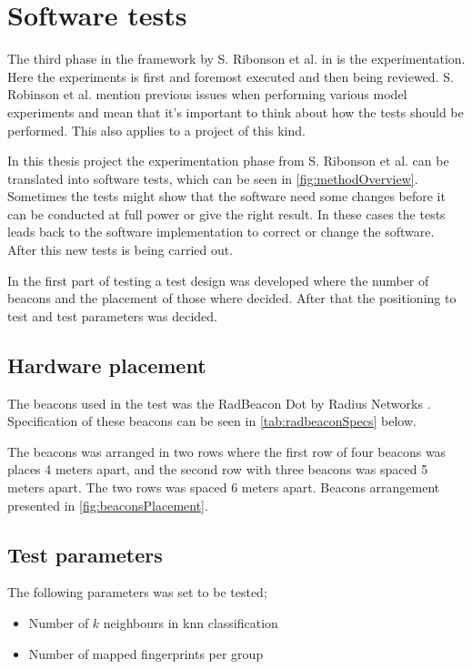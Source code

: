 \section{Software tests}\label{sec:methodSoftwareTests}
The third phase in the framework by S. Ribonson et al. in \cite{SecretsSuccessfulSimulation1995} is the experimentation.
Here the experiments is first and foremost executed and then being reviewed.
S. Robinson et al. mention previous issues when performing various model experiments and mean that it's important to think about how the tests should be performed.
This also applies to a project of this kind.

\bigskip

In this thesis project the experimentation phase from S. Ribonson et al. can be translated into software tests, which can be seen in \cref{fig:methodOverview}.
Sometimes the tests might show that the software need some changes before it can be conducted at full power or give the right result.
In these cases the tests leads back to the software implementation to correct or change the software.
After this new tests is being carried out.

\bigskip

In the first part of testing a test design was developed where the number of beacons and the placement of those where decided.
After that the positioning to test and test parameters was decided.


\subsection{Hardware placement}\label{sec:methodTestHardware}
The beacons used in the test was the RadBeacon Dot by Radius Networks \cite{RadBeaconDotDatasheet}.
Specification of these beacons can be seen in \cref{tab:radbeaconSpecs} below.


\bigskip

The beacons was arranged in two rows where the first row of four beacons was places 4 meters apart,  and the second row with three beacons was spaced 5 meters apart.
The two rows was spaced 6 meters apart.
Beacons arrangement presented in \cref{fig:beaconsPlacement}.



\subsection{Test parameters}\label{sec:methodTestParameters}
The following parameters was set to be tested;

\begin{itemize}
\item Number of $k$ neighbours in \acrshort{knn} classification
\item Number of mapped fingerprints per group
\end{itemize}
